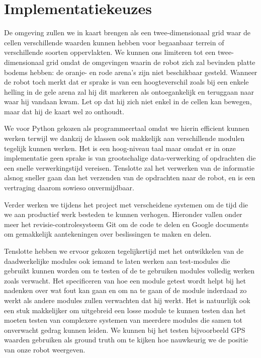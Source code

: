 \documentclass[a4paper, 11pt]{article}
\begin{document}
\section*{Implementatiekeuzes}
  De omgeving zullen we in kaart brengen als een twee-dimensionaal grid waar de cellen verschillende waarden kunnen
  hebben voor begaanbaar terrein of verschillende soorten oppervlakten. We kunnen ons limiteren tot een twee-
  dimensionaal grid omdat de omgevingen waarin de robot zich zal bevinden platte bodems hebben: de oranje- en rode
  arena's zijn niet beschikbaar gesteld. Wanneer de robot toch merkt dat er sprake is van een hoogteverschil zoals
  bij een enkele helling in de gele arena zal hij dit markeren als ontoegankelijk en teruggaan naar waar hij 
  vandaan kwam. Let op dat hij zich niet enkel in de cellen kan bewegen, maar dat hij de kaart wel zo onthoudt.

  We voor Python gekozen als programmeertaal omdat we hierin efficient kunnen werken terwijl we dankzij de
  klassen ook makkelijk aan verschillende modulen tegelijk kunnen werken. Het is een
  hoog-niveau taal maar omdat er in onze implementatie geen sprake is van grootschalige data-verwerking of 
  opdrachten die een snelle verwerkingstijd vereisen. Tenslotte zal het verwerken van de informatie alsnog sneller
  gaan dan het verzenden van de opdrachten naar de robot, en is een vertraging daarom sowieso onvermijdbaar.

  Verder werken we tijdens het project met verscheidene systemen om de tijd die we aan productief werk besteden
  te kunnen verhogen. Hieronder vallen onder meer het revisie-controlesysteem Git om de code te delen en Google
  documents om gemakkelijk aantekeningen over beslissingen te maken en delen.


  
  Tenslotte hebben we ervoor gekozen tegelijkertijd met het ontwikkelen van de daadwerkelijke modules ook iemand
  te laten werken aan test-modules die gebruikt kunnen worden om te testen of de te gebruiken modules volledig
  werken zoals verwacht. Het specificeren van hoe een module getest wordt helpt bij het nadenken over wat fout
  kan gaan en om na te gaan of de module inderdaad zo werkt als andere modules zullen verwachten dat hij werkt.
  Het is natuurlijk ook een stuk makkelijker om uitgebreid een losse module te kunnen testen dan het moeten testen
  van complexere systemen van meerdere modules die samen tot onverwacht gedrag kunnen leiden. We kunnen bij het
  testen bijvoorbeeld GPS waarden gebruiken als ground truth om te kijken hoe nauwkeurig we de positie van onze
  robot weergeven.
\end{document}
